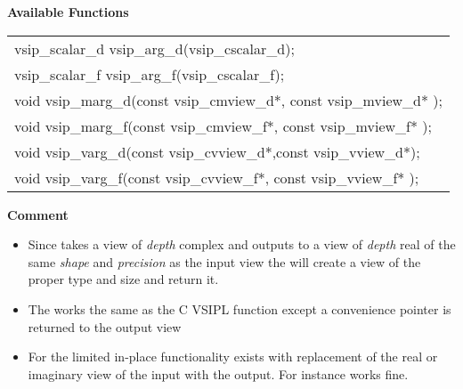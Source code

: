 \cvsiplh
\newline \hspace*{.8cm} \vspace*{.1cm} \textbf{Available Functions }
\newline \hspace*{1.1cm} {
\ttfamily
\begin{tabular}[H]{l}
vsip\_scalar\_d vsip\_arg\_d(vsip\_cscalar\_d);\\
vsip\_scalar\_f vsip\_arg\_f(vsip\_cscalar\_f);\\
void vsip\_marg\_d(const vsip\_cmview\_d*, const vsip\_mview\_d* );\\
void vsip\_marg\_f(const vsip\_cmview\_f*, const vsip\_mview\_f* );\\
void vsip\_varg\_d(const vsip\_cvview\_d*,const vsip\_vview\_d*);\\
void vsip\_varg\_f(const vsip\_cvview\_f*, const vsip\_vview\_f* );\\
\end{tabular}
}
\pyjvsiph
{}
\newline \hspace*{.8cm}\textbf{Comment}\\
\hspace*{.8cm}\parbox{11cm}{\vspace*{.2cm}
\begin{itemize}
\item{Since  takes a view of \emph{depth} complex and outputs to a view of \emph{depth} real of the same \emph{shape} and \emph{precision} as the input view the  \pyjvmethod will create a view of the proper type and size and return it.}
\item{The  \pyjvfunc works the same as the C VSIPL function except a convenience pointer is returned to the output view}
\item{For the \pyjvfunc limited in-place functionality exists with replacement of the real or imaginary view of the input with the output. For instance  works fine.}
\end{itemize}}
